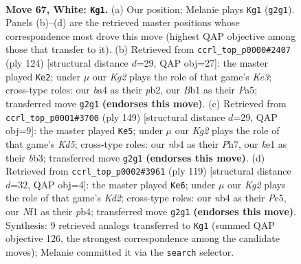 \documentclass[11pt]{article}
\begin{document}
\clearpage

\begin{figure}[p]\centering
\begin{subfigure}{0.46\textwidth}\centering
\resizebox{\linewidth}{!}{%
\newchessgame
\chessboard[
  setfen={8/2r2p1p/6p1/4P3/bn3Pp1/8/6KP/1B2kN2 w - - 24 67},
  showmover=false,
  pgfstyle=straightmove, color=movearrow, markmove={g2-g1}
]}
\caption{}
\end{subfigure}\hfill
\begin{subfigure}{0.46\textwidth}\centering
\resizebox{\linewidth}{!}{%
\newchessgame
\chessboard[
  setfen={8/6p1/p4pP1/P3pP2/4P3/4K3/1pkN4/8 w - - 11 63},
  showmover=false,
  pgfstyle=straightmove, color=movearrow, markmove={e3-e2}
]}
\caption{}
\end{subfigure}
\\[4pt]
\begin{subfigure}{0.46\textwidth}\centering
\resizebox{\linewidth}{!}{%
\newchessgame
\chessboard[
  setfen={5B2/7p/p5p1/P2n1p2/3k3P/1B4P1/3K1P2/5b2 b - - 0 75},
  showmover=false,
  pgfstyle=straightmove, color=movearrow, markmove={d4-e5}
]}
\caption{}
\end{subfigure}\hfill
\begin{subfigure}{0.46\textwidth}\centering
\resizebox{\linewidth}{!}{%
\newchessgame
\chessboard[
  setfen={8/3k3p/2p3p1/2P1p3/1PN1Pn1P/5P2/5K2/8 b - - 4 60},
  showmover=false,
  pgfstyle=straightmove, color=movearrow, markmove={d7-e6}
]}
\caption{}
\end{subfigure}
\caption{\textbf{Move 67, White: \texttt{Kg1}.} (a) Our position; Melanie plays \texttt{Kg1} (\texttt{g2g1}). Panels (b)--(d) are the retrieved master positions whose correspondence most drove this move (highest QAP objective among those that transfer to it). (b) Retrieved from \texttt{ccrl\_top\_p0000\#2407} (ply 124) [structural distance $d$=29, QAP obj=27]: the master played \texttt{Ke2}; under $\mu$ our \emph{Kg2} plays the role of that game's \emph{Ke3}; cross-type roles: our \emph{b}a4 as their \emph{p}b2, our \emph{B}b1 as their \emph{P}a5; transferred move \texttt{g2g1} \textbf{(endorses this move)}. (c) Retrieved from \texttt{ccrl\_top\_p0001\#3700} (ply 149) [structural distance $d$=29, QAP obj=9]: the master played \texttt{Ke5}; under $\mu$ our \emph{Kg2} plays the role of that game's \emph{Kd5}; cross-type roles: our \emph{n}b4 as their \emph{P}h7, our \emph{k}e1 as their \emph{b}b3; transferred move \texttt{g2g1} \textbf{(endorses this move)}. (d) Retrieved from \texttt{ccrl\_top\_p0002\#3961} (ply 119) [structural distance $d$=32, QAP obj=4]: the master played \texttt{Ke6}; under $\mu$ our \emph{Kg2} plays the role of that game's \emph{Kd2}; cross-type roles: our \emph{n}b4 as their \emph{P}e5, our \emph{N}f1 as their \emph{p}b4; transferred move \texttt{g2g1} \textbf{(endorses this move)}. Synthesis: 9 retrieved analogs transferred to \texttt{Kg1} (summed QAP objective 126, the strongest correspondence among the candidate moves); Melanie committed it via the \texttt{search} selector.}
\label{fig:thought-m132}
\end{figure}
\end{document}
